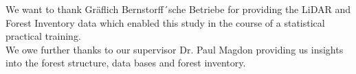 
\vspace{3cm}

We want to thank Gräflich Bernstorff´sche Betriebe for providing the LiDAR and Forest Inventory data which enabled this study in the course of a statistical practical training.\\

We owe further thanks to our supervisor Dr. Paul Magdon providing us insights into the forest structure, data bases and forest inventory.